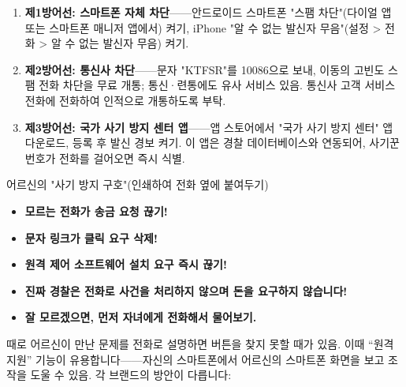 
\begin{enumerate}
  \item \textbf{제1방어선: 스마트폰 자체 차단}——안드로이드 스마트폰 "스팸 차단"(다이얼 앱 또는 스마트폰 매니저 앱에서) 켜기, iPhone "알 수 없는 발신자 무음"(설정 > 전화 > 알 수 없는 발신자 무음) 켜기.
  \item \textbf{제2방어선: 통신사 차단}——문자 "KTFSR"를 10086으로 보내, 이동의 고빈도 스팸 전화 차단을 무료 개통; 통신·련통에도 유사 서비스 있음. 통신사 고객 서비스 전화에 전화하여 인적으로 개통하도록 부탁.
  \item \textbf{제3방어선: 국가 사기 방지 센터 앱}——앱 스토어에서 "국가 사기 방지 센터" 앱 다운로드, 등록 후 발신 경보 켜기. 이 앱은 경찰 데이터베이스와 연동되어, 사기꾼 번호가 전화를 걸어오면 즉시 식별.
\end{enumerate}

\begin{tcbwarn}{어르신의 "사기 방지 구호"(인쇄하여 전화 옆에 붙여두기)}
\begin{itemize}
  \item \textbf{모르는 전화가 송금 요청 끊기!}
  \item \textbf{문자 링크가 클릭 요구 삭제!}
  \item \textbf{원격 제어 소프트웨어 설치 요구 즉시 끊기!}
  \item \textbf{진짜 경찰은 전화로 사건을 처리하지 않으며 돈을 요구하지 않습니다!}
  \item \textbf{잘 모르겠으면, 먼저 자녀에게 전화해서 물어보기.}
\end{itemize}

\end{tcbwarn}


때로 어르신이 만난 문제를 전화로 설명하면 버튼을 찾지 못할 때가 있음. 이때 “원격 지원” 기능이 유용합니다——자신의 스마트폰에서 어르신의 스마트폰 화면을 보고 조작을 도울 수 있음. 각 브랜드의 방안이 다릅니다:

